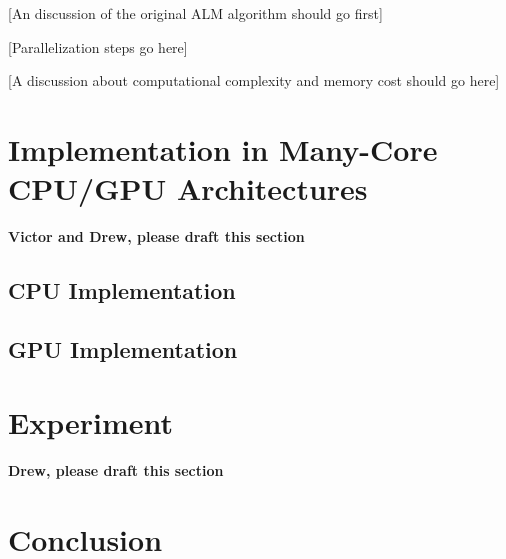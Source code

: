 \documentclass[times, 10pt,twocolumn, conference]{article}
\begin{document}
[An discussion of the original ALM algorithm should go first]

[Parallelization steps go here]

[A discussion about computational complexity and memory cost should go here]

\section{Implementation in Many-Core CPU/GPU Architectures}
\label{sec:algorithm}

{\bf Victor and Drew, please draft this section}

\subsection{CPU Implementation}

\subsection{GPU Implementation}

\section{Experiment}
\label{sec:experiment}

{\bf Drew, please draft this section}

\section{Conclusion}
\label{sec:conclusion}

{\small


}
\end{document}
